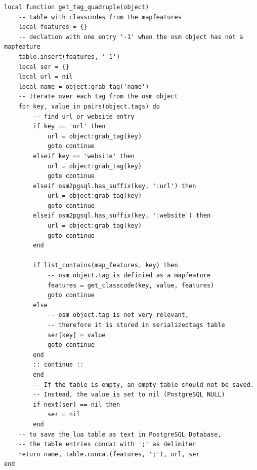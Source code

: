 \newpage\begin{lstlisting}[language={[5.0]Lua}, caption={Hilfsfunktion zur osm object.tag Verarbeitung},label={lst:get-quadruple}]
	local function get_tag_quadruple(object)
	-- table with classcodes from the mapfeatures
	local features = {}
	-- declation with one entry '-1' when the osm object has not a mapfeature
	table.insert(features, '-1')
	local ser = {}
	local url = nil
	local name = object:grab_tag('name')
	-- Iterate over each tag from the osm object
	for key, value in pairs(object.tags) do
		-- find url or website entry
		if key == 'url' then
			url = object:grab_tag(key)
			goto continue
		elseif key == 'website' then
			url = object:grab_tag(key)
			goto continue
		elseif osm2pgsql.has_suffix(key, ':url') then
			url = object:grab_tag(key)
			goto continue
		elseif osm2pgsql.has_suffix(key, ':website') then
			url = object:grab_tag(key)
			goto continue
		end
	
		if list_contains(map_features, key) then
			-- osm object.tag is definied as a mapfeature
			features = get_classcode(key, value, features)
			goto continue
		else
			-- osm object.tag is not very relevant,
			-- therefore it is stored in serializedtags table
			ser[key] = value
			goto continue
		end
		:: continue ::
		end
		-- If the table is empty, an empty table should not be saved.
		-- Instead, the value is set to nil (PostgreSQL NULL)
		if next(ser) == nil then
			ser = nil
		end
	-- to save the lua table as text in PostgreSQL Database,
	-- the table entries concat with ';' as delimiter
	return name, table.concat(features, ';'), url, ser
end
\end{lstlisting}

\newpage
